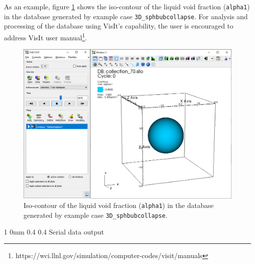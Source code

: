 \documentclass[11pt]{article}
\makeatletter
\renewcommand{\subsection}{\@startsection
{subsection}%
{1}%
{0mm}%
{0.4\baselineskip}%
{0.4\baselineskip}%
{\normalfont\large\bfseries\color{myBrown}}}%
\makeatother
\begin{document}
As an example, figure \ref{fig:visit} shows the iso-contour of the liquid void fraction (\texttt{alpha1}) in the database generated by example case \texttt{3D_sphbubcollapse}.
For analysis and processing of the database using VisIt's capability, the user is encouraged to address VisIt user manual\footnote{https://wci.llnl.gov/simulation/computer-codes/visit/manuals}.
\begin{figure}[H]
    \center
    \includegraphics[width=\textwidth]{visit.png}
    \caption{Iso-contour of the liquid void fraction (\texttt{alpha1}) in the database generated by example case \texttt{3D_sphbubcollapse}.}
    \label{fig:visit} 
\end{figure}

\subsection{Serial data output}\label{s:serialdata}
\end{document}
